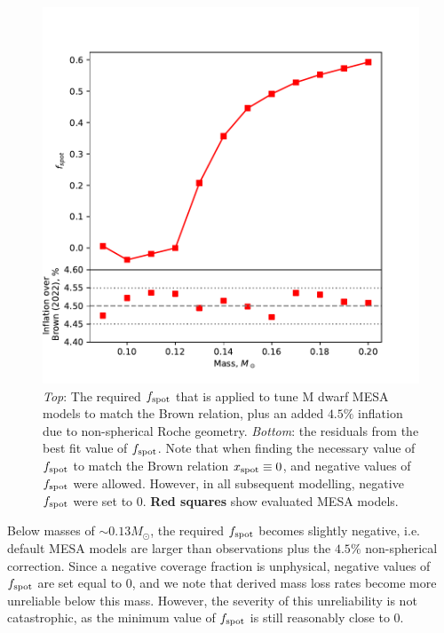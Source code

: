 \begin{figure}
    \centering
    \includegraphics[width=\textwidth]{figures/modelling/fspot_relation_to_match_brown_plus_4.5.pdf}
    \caption{{\it Top}: The required $f_{\rm spot}$ that is applied to tune M dwarf MESA models to match the Brown relation, plus an added $4.5\%$ inflation due to non-spherical Roche geometry. {\it Bottom}: the residuals from the best fit value of $f_{\rm spot}$. Note that when finding the necessary value of $f_{\rm spot}$ to match the Brown relation $x_{\rm spot} \equiv 0$, and negative values of $f_{\rm spot}$ were allowed. However, in all subsequent modelling, negative $f_{\rm spot}$ were set to 0. {\bf Red squares} show evaluated MESA models.}
    \label{fig:modelling:fspot mass relationship}
\end{figure}

Below masses of $\sim 0.13 M_\odot$, the required $f_{\rm spot}$ becomes slightly negative, i.e. default MESA models are larger than observations plus the $4.5\%$ non-spherical correction.
Since a negative coverage fraction is unphysical, negative values of $f_{\rm spot}$ are set equal to 0, and we note that derived mass loss rates become more unreliable below this mass.
However, the severity of this unreliability is not catastrophic, as the minimum value of $f_{\rm spot}$ is still reasonably close to 0.

